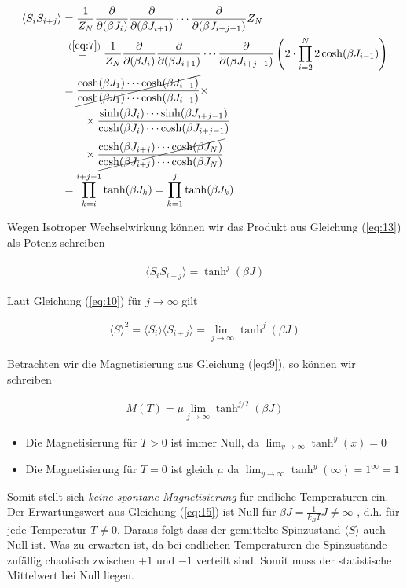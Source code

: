 \begin{align}
  \label{eq:13}
  \langle S_iS_{i+j}\rangle &=  \frac{1}{Z_N} \pdiff_{(\beta J_i)}\pdiff_{(\beta J_{i+1})}\cdots \pdiff_{(\beta J_{i+j-1})} Z_N \notag\\
&\stackrel{~(\ref{eq:7})}=  \frac{1}{Z_N} \pdiff_{(\beta J_i)}\pdiff_{(\beta J_{i+1})}\cdots \pdiff_{(\beta J_{i+j-1})} \left(2\cdot\prod_{i=2}^N2\cosh( \beta J_{i-1})\right)  \notag\\
&=\cancel{\frac{\cosh(\beta J_{1})\cdots \cosh(\beta J_{i-1})}{ \cosh(\beta J_{1})\cdots \cosh(\beta J_{i-1})} } \times\notag \\
&\qquad\times \frac{ \sinh(\beta J_{i})\cdots\sinh(\beta J_{i+j-1})}{\cosh(\beta J_{i})\cdots\cosh(\beta J_{i+j-1})}\notag \\
&\qquad \times \cancel{ \frac{  \cosh(\beta J_{i+j}) \cdots \cosh(\beta J_{N})  }{   \cosh(\beta J_{i+j}) \cdots \cosh(\beta J_{N}) }} \notag\\
%
&=\prod_{k=i}^{i+j-1} \tanh(\beta J_{k}) = \prod_{k=1}^{j} \tanh(\beta J_{k})
\end{align}

Wegen Isotroper Wechselwirkung können wir das Produkt aus Gleichung (\ref{eq:13}) als Potenz schreiben

\begin{align}
  \label{eq:14}
   \langle S_iS_{i+j}\rangle =  \tanh^j(\beta J)
\end{align}

Laut Gleichung (\ref{eq:10}) für \(j\to\infty\) gilt

\begin{align}
  \label{eq:15}
\langle S \rangle^2 =  \langle S_i\rangle\langle S_{i+j}\rangle = \lim_{j\to\infty} \tanh^j(\beta J)
\end{align}

Betrachten wir die Magnetisierung aus Gleichung (\ref{eq:9}), so können wir schreiben

\begin{align}
  \label{eq:16}
  M(T) = \mu \lim_{j\to\infty} \tanh^{j/2}(\beta J)
\end{align}

\begin{itemize}
\item Die Magnetisierung für \(T>0\) ist immer Null, da \(\lim_{y\to\infty}\tanh^y(x)=0\)
\item Die Magnetisierung für \(T=0\) ist gleich \(\mu\) da \(\lim_{y\to\infty}\tanh^y(\infty)=1^\infty=1\)
\end{itemize}

Somit stellt sich \textit{keine spontane Magnetisierung} für endliche Temperaturen ein.\\

Der Erwartungswert aus Gleichung (\ref{eq:15}) ist Null für \(\beta J=\frac{1}{k_BT} J \ne \infty \) , d.h. für jede Temperatur \(T\ne 0\). Daraus folgt dass der gemittelte Spinzustand \(\langle S \rangle\)  auch Null ist. Was zu erwarten ist, da bei endlichen Temperaturen die Spinzustände zufällig chaotisch zwischen \(+ 1\) und \(-1\) verteilt sind. Somit muss der statistische Mittelwert bei Null liegen.


